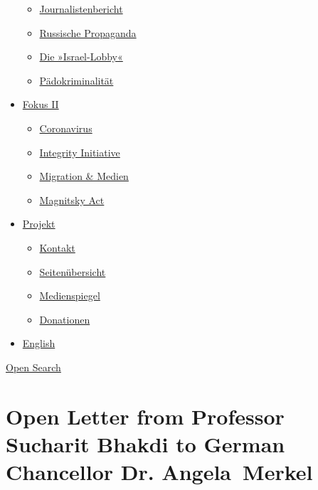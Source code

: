 \begin{itemize}
  \begin{itemize}
  \tightlist
  \item
    \href{https://swprs.org/bericht-eines-journalisten/}{Journalistenbericht}
  \item
    \href{https://swprs.org/russische-propaganda/}{Russische Propaganda}
  \item
    \href{https://swprs.org/die-israel-lobby-fakten-und-mythen/}{Die
    »Israel-Lobby«}
  \item
    \href{https://swprs.org/geopolitik-und-paedokriminalitaet/}{Pädokriminalität}
  \end{itemize}
\item
  \href{https://swprs.org/migration-und-medien/}{Fokus II}

  \begin{itemize}
  \tightlist
  \item
    \href{https://swprs.org/covid-19-hinweis-ii/}{Coronavirus}
  \item
    \href{https://swprs.org/die-integrity-initiative/}{Integrity
    Initiative}
  \item
    \href{https://swprs.org/migration-und-medien/}{Migration \& Medien}
  \item
    \href{https://swprs.org/der-fall-magnitsky/}{Magnitsky Act}
  \end{itemize}
\item
  \href{https://swprs.org/kontakt/}{Projekt}

  \begin{itemize}
  \tightlist
  \item
    \href{https://swprs.org/kontakt/}{Kontakt}
  \item
    \href{https://swprs.org/uebersicht/}{Seitenübersicht}
  \item
    \href{https://swprs.org/medienspiegel/}{Medienspiegel}
  \item
    \href{https://swprs.org/donationen/}{Donationen}
  \end{itemize}
\item
  \href{https://swprs.org/contact/}{English}
\end{itemize}

\protect\hyperlink{}{Open Search}

\hypertarget{open-letter-from-professor-sucharit-bhakdi-to-german-chancellor-dr-angela-merkel}{%
\section{Open Letter from Professor Sucharit Bhakdi to German Chancellor
Dr.
Angela~Merkel}\label{open-letter-from-professor-sucharit-bhakdi-to-german-chancellor-dr-angela-merkel}}

